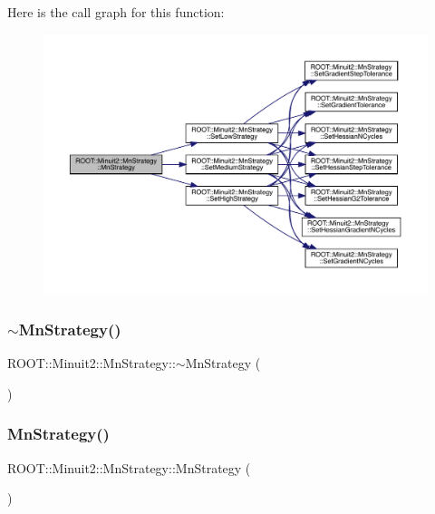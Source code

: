 Here is the call graph for this function\+:\nopagebreak
\begin{figure}[H]
\begin{center}
\leavevmode
\includegraphics[width=350pt]{da/de4/classROOT_1_1Minuit2_1_1MnStrategy_ad70367966dc3b7cdf1be671acb3824d0_cgraph}
\end{center}
\end{figure}
\mbox{\label{classROOT_1_1Minuit2_1_1MnStrategy_a65ddda119cec991c9d07671c1a8af521}} 
\subsubsection{\texorpdfstring{$\sim$MnStrategy()}{~MnStrategy()}\hspace{0.1cm}{\footnotesize\ttfamily [1/2]}}
{\footnotesize\ttfamily R\+O\+O\+T\+::\+Minuit2\+::\+Mn\+Strategy\+::$\sim$\+Mn\+Strategy (\begin{DoxyParamCaption}{ }\end{DoxyParamCaption})\hspace{0.3cm}{\ttfamily [inline]}}

\mbox{\label{classROOT_1_1Minuit2_1_1MnStrategy_a231337ee8aec47874370bc4b64683374}} 
\subsubsection{\texorpdfstring{MnStrategy()}{MnStrategy()}\hspace{0.1cm}{\footnotesize\ttfamily [3/4]}}
{\footnotesize\ttfamily R\+O\+O\+T\+::\+Minuit2\+::\+Mn\+Strategy\+::\+Mn\+Strategy (\begin{DoxyParamCaption}{ }\end{DoxyParamCaption})}

